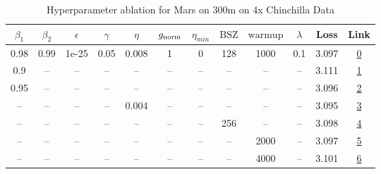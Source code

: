 \begin{table}[H]
\centering
\caption{Hyperparameter ablation for Mars on 300m on 4x Chinchilla Data}
\label{tab:ablation_mars_300m_on_4x_chinchilla_data}
\begin{tabular}{cccccccccccc}
\toprule
$\beta_1$ & $\beta_2$ & $\epsilon$ & $\gamma$ & $\eta$ & $g_{\mathrm{norm}}$ & $\eta_{min}$ & $\mathrm{BSZ}$ & $\mathrm{warmup}$ & $\lambda$ & Loss & Link \\
\midrule
0.98 & 0.99 & 1e-25 & 0.05 & 0.008 & 1 & 0 & 128 & 1000 & 0.1 & 3.097 & \href{https://wandb.ai/marin-community/optimizer-scaling/runs/sweep-300m-24B-mars3a0394lr0.008-wd0.1-minlr0-warmup1000-b10.98--79e319}{0} \\
\midrule
0.9 & -- & -- & -- & -- & -- & -- & -- & -- & -- & 3.111 & \href{https://wandb.ai/marin-community/optimizer-scaling/runs/sweep-300m-24B-mars4adeb3lr0.008-wd0.1-minlr0-warmup1000-b10.9-b-56d9fa}{1} \\
0.95 & -- & -- & -- & -- & -- & -- & -- & -- & -- & 3.096 & \href{https://wandb.ai/marin-community/optimizer-scaling/runs/sweep-300m-24B-mars0c24e7lr0.008-wd0.1-minlr0-warmup1000-b10.95--e508fb}{2} \\
-- & -- & -- & -- & 0.004 & -- & -- & -- & -- & -- & 3.095 & \href{https://wandb.ai/marin-community/optimizer-scaling/runs/sweep-300m-24B-mars98645clr0.004-wd0.1-minlr0-warmup1000-b10.98--72b012}{3} \\
-- & -- & -- & -- & -- & -- & -- & 256 & -- & -- & 3.098 & \href{https://wandb.ai/marin-community/optimizer-scaling/runs/sweep-300m-24B-marsbb066blr0.008-wd0.1-minlr0-warmup1000-b10.98--71162e}{4} \\
-- & -- & -- & -- & -- & -- & -- & -- & 2000 & -- & 3.097 & \href{https://wandb.ai/marin-community/optimizer-scaling/runs/sweep-300m-24B-mars3f97e6lr0.008-wd0.1-minlr0-warmup2000-b10.98--d090a1}{5} \\
-- & -- & -- & -- & -- & -- & -- & -- & 4000 & -- & 3.101 & \href{https://wandb.ai/marin-community/optimizer-scaling/runs/sweep-300m-24B-mars9edcd4lr0.008-wd0.1-minlr0-warmup4000-b10.98--b278a3}{6} \\
\bottomrule
\end{tabular}
\end{table}

